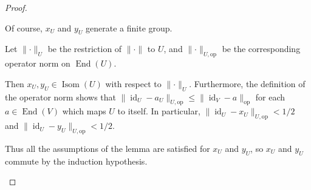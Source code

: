 \documentclass[10pt,a4paper]{amsart}
\DeclareMathOperator{\End}{End}
\DeclareMathOperator{\U}{Isom}
\DeclareMathOperator{\id}{id}
\newcommand*{\norm}[1]{\lVert#1\rVert}
\newcommand*{\normop}[1]{\lVert#1\rVert_\text{op}}
\newcommand*{\normopU}[1]{\lVert#1\rVert_{U, \text{op}}}
\begin{document}
\begin{proof}
\begin{itemize}
  Of course, $x_U$ and $y_U$ generate a finite group.

  Let $\norm{\cdot}_U$ be the restriction of $\norm{\cdot}$ to $U$,
  and ${\normopU{\cdot}}$ be the corresponding operator norm on
  $\End(U)$.

  Then $x_U, y_U\in\U(U)$ with respect to
  $\norm{\cdot}_U$. Furthermore, the definition of the operator norm
  shows that $\normopU{\id_U-a_U}\le\normop{\id_V-a}$ for each
  $a\in\End(V)$ which maps $U$ to itself. In particular,
  $\normopU{\id_U-x_U}<1/2$ and $\normopU{\id_U-y_U}<1/2$.

  Thus all the assumptions of the lemma are satisfied for $x_U$ and
  $y_U$, so $x_U$ and $y_U$ commute by the induction hypothesis.
\end{itemize}
\end{proof}
\end{document}
